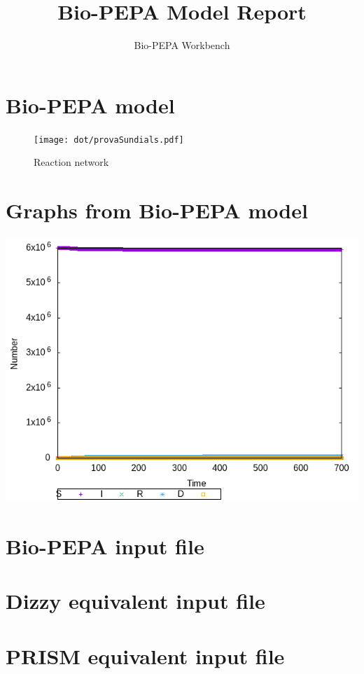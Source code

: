 \documentclass{llncs}
\title{Bio-PEPA Model Report}
\author{Bio-PEPA Workbench}
\institute{\today}
\begin{document}
\maketitle
\section{Bio-PEPA model}

\begin{figure}[htbp]
\begin{center}
\texttt{[image: dot/provaSundials.pdf]}
\caption{Reaction network}
\end{center}
\end{figure}
\newpage
\section{Graphs from Bio-PEPA model}
\includegraphics[scale=0.5]{png/provaSundials001_sundials_results_0}
\appendix
\newpage
\section{Bio-PEPA input file}

\newpage
\section{Dizzy equivalent input file}

\newpage
\section{PRISM equivalent input file}

\end{document}
